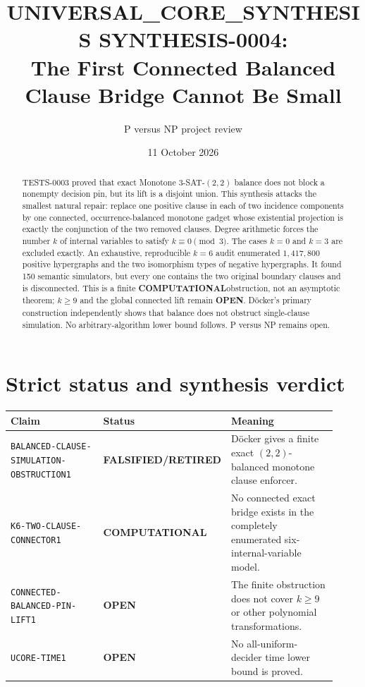 \documentclass[11pt]{article}
\title{UNIVERSAL\_CORE\_SYNTHESIS SYNTHESIS-0004:\\
The First Connected Balanced Clause Bridge Cannot Be Small}
\author{P versus NP project review}
\date{11 October 2026}
\newcommand{\OPEN}{\textbf{OPEN}}
\newcommand{\COMP}{\textbf{COMPUTATIONAL}}
\newcommand{\RETIRED}{\textbf{FALSIFIED/RETIRED}}
\begin{document}
\maketitle

\begin{abstract}
TESTS-0003 proved that exact Monotone $3$-SAT-$(2,2)$ balance does not block
a nonempty decision pin, but its lift is a disjoint union.  This synthesis
attacks the smallest natural repair: replace one positive clause in each of
two incidence components by one connected, occurrence-balanced monotone
gadget whose existential projection is exactly the conjunction of the two
removed clauses.  Degree arithmetic forces the number $k$ of internal
variables to satisfy $k\equiv0\pmod3$.  The cases $k=0$ and $k=3$ are
excluded exactly.  An exhaustive, reproducible $k=6$ audit enumerated
$1{,}417{,}800$ positive hypergraphs and the two isomorphism types of
negative hypergraphs.  It found 150 semantic simulators, but every one
contains the two original boundary clauses and is disconnected.  This is a
finite \COMP obstruction, not an asymptotic theorem; $k\ge9$ and the global
connected lift remain \OPEN.  D\"ocker's primary construction independently
shows that balance does not obstruct single-clause simulation.  No
arbitrary-algorithm lower bound follows.  P versus NP remains open.
\end{abstract}

\section{Strict status and synthesis verdict}

\begin{center}
\small
\begin{tabular}{p{0.34\linewidth}p{0.19\linewidth}p{0.39\linewidth}}
\toprule
Claim & Status & Meaning\\
\midrule
\texttt{BALANCED-CLAUSE-SIMULATION-OBSTRUCTION1} & \RETIRED &
D\"ocker gives a finite exact $(2,2)$-balanced monotone clause enforcer.\\
\texttt{K6-TWO-CLAUSE-CONNECTOR1} & \COMP &
No connected exact bridge exists in the completely enumerated six-internal-variable model.\\
\texttt{CONNECTED-BALANCED-PIN-LIFT1} & \OPEN &
The finite obstruction does not cover $k\ge9$ or other polynomial transformations.\\
\texttt{UCORE-TIME1} & \OPEN &
No all-uniform-decider time lower bound is proved.\\
\bottomrule
\end{tabular}
\end{center}
\end{document}
